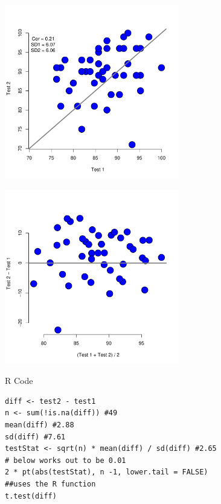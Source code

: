 \documentclass[aspectratio=169]{beamer}
\begin{document}
\begin{frame}
\begin{center}
  \includegraphics[height=3in]{pairPlot.pdf}
\end{center}
\end{frame}

\begin{frame}
\begin{center}
  \includegraphics[height=3in]{tmd.pdf}
\end{center}
\end{frame}

\begin{frame}[fragile]
R Code
\begin{verbatim}
diff <- test2 - test1
n <- sum(!is.na(diff)) #49
mean(diff) #2.88
sd(diff) #7.61
testStat <- sqrt(n) * mean(diff) / sd(diff) #2.65
# below works out to be 0.01
2 * pt(abs(testStat), n -1, lower.tail = FALSE) 
##uses the R function
t.test(diff)
\end{verbatim}  
\end{frame}
\end{document}
